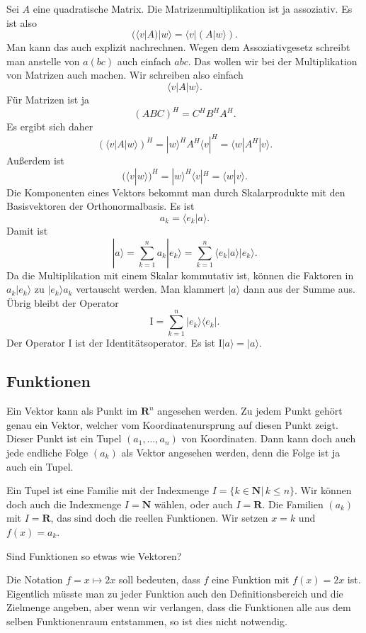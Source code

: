 \documentclass[a4paper,10pt,fleqn,twocolumn,twoside]{article}
\begin{document}
Sei $A$ eine quadratische Matrix. Die Matrizenmultiplikation ist
ja assoziativ. Es ist also
\[(\langle v|A)|w\rangle = \langle v|(A|w\rangle).\]
Man kann das auch explizit nachrechnen. Wegen dem Assoziativgesetz
schreibt man anstelle von $a(bc)$ auch einfach $abc$. Das wollen
wir bei der Multiplikation von Matrizen auch machen. Wir schreiben also einfach
\[\langle v|A|w\rangle.\]
Für Matrizen ist ja
\[(ABC)^H = C^HB^HA^H.\]
Es ergibt sich daher
\[(\langle v|A|w\rangle)^H = |w\rangle^H A^H \langle v|^H
= \langle w|A^H|v\rangle.\]
Außerdem ist
\[(\langle v|w\rangle)^H = |w\rangle^H\langle v|^H
= \langle w|v\rangle.\]
Die Komponenten eines Vektors bekommt man durch Skalarprodukte mit
den Basisvektoren der Orthonormalbasis. Es ist
\[a_k = \langle e_k|a\rangle.\]
Damit ist
\[|a\rangle = \sum_{k=1}^n a_k |e_k\rangle
= \sum_{k=1}^n \langle e_k|a\rangle |e_k\rangle.\]
Da die Multiplikation mit einem Skalar kommutativ ist, können die
Faktoren in $a_k|e_k\rangle$ zu $|e_k\rangle a_k$ vertauscht
werden. Man klammert $|a\rangle$ dann aus der Summe aus.
Übrig bleibt der Operator
\[\mathrm I = \sum_{k=1}^n |e_k\rangle\langle e_k|.\]
Der Operator $\mathrm I$ ist der Identitätsoperator.
Es ist $\mathrm I|a\rangle = |a\rangle$.


\subsection{Funktionen}

Ein Vektor kann als Punkt im $\mathbf R^n$ angesehen werden.
Zu jedem Punkt gehört genau ein Vektor, welcher vom
Koordinatenursprung auf diesen Punkt zeigt. Dieser Punkt ist
ein Tupel $(a_1,\ldots,a_n)$ von Koordinaten. Dann kann doch auch
jede endliche Folge $(a_k)$ als Vektor angesehen werden, denn die
Folge ist ja auch ein Tupel.

Ein Tupel ist eine Familie mit der Indexmenge
$I=\{k\in\mathbf N|\,k\leq n\}.$ Wir können doch auch die
Indexmenge $I=\mathbf N$ wählen, oder auch $I=\mathbf R$.
Die Familien $(a_k)$ mit $I=\mathbf R$, das sind doch die
reellen Funktionen. Wir setzen $x=k$ und $f(x)=a_k$.

Sind Funktionen so etwas wie Vektoren?

Die Notation $f=x\mapsto 2x$ soll bedeuten, dass $f$ eine
Funktion mit $f(x)=2x$ ist. Eigentlich müsste man zu jeder Funktion
auch den Definitionsbereich und die Zielmenge angeben, aber wenn
wir verlangen, dass die Funktionen alle aus dem selben Funktionenraum
entstammen, so ist dies nicht notwendig.
\end{document}

